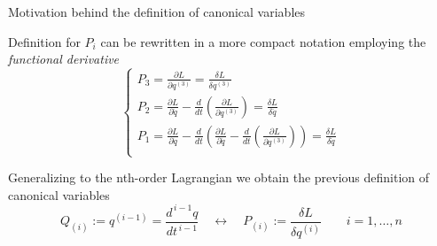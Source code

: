 \begin{frame}{Motivation behind the definition of canonical variables}
  \begin{alertblock}{}
    Definition for $P_i$ can be rewritten in a more compact notation employing
    the \emph{functional derivative}
    \begin{equation*}
      \begin{cases}
        P_3  = \frac{\partial L}{\partial q^{(3)}}
             = \frac{\delta L}{\delta q^{(3)}} \\
        P_2  = \frac{\partial L}{\partial \ddot{q}} -
               \frac{d}{dt} \left(
                 \frac{\partial L}{\partial q^{(3)}}
               \right)
             = \frac{\delta L}{\delta \ddot{q}} \\
        P_1  = \frac{\partial L}{\partial \dot{q}} -
               \frac{d}{dt} \left(
                 \frac{\partial L}{\partial \ddot{q}} -
                 \frac{d}{dt} \left(
                   \frac{\partial L}{\partial q^{(3)}}
                  \right)
                \right)
             = \frac{\delta L}{\delta \dot{q}} \\
      \end{cases}
    \end{equation*}

    Generalizing to the nth-order Lagrangian we obtain the previous definition
    of canonical variables
    \begin{equation*}
      Q_{(i)} := q^{(i-1)} = \frac{d^{\, i-1} q}{dt^{\, i-1}}
      \quad \leftrightarrow \quad
      P_{(i)} := \frac{\delta L}{\delta q^{(i)}}
      \qquad i = 1, \ldots, n
    \end{equation*}
  \end{alertblock}
\end{frame}
